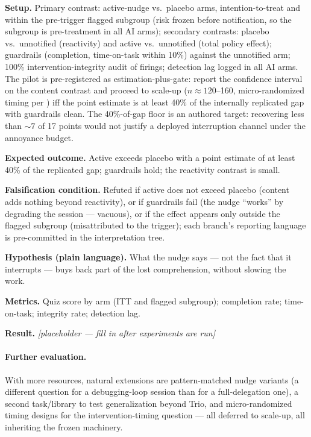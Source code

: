 \documentclass[11pt]{article}
\begin{document}
\textbf{Setup.} Primary contrast: active-nudge vs.\ placebo arms, intention-to-treat and within the pre-trigger flagged subgroup (risk frozen before notification, so the subgroup is pre-treatment in all AI arms); secondary contrasts: placebo vs.\ unnotified (reactivity) and active vs.\ unnotified (total policy effect); guardrails (completion, time-on-task within 10\%) against the unnotified arm; 100\% intervention-integrity audit of firings; detection lag logged in all AI arms. The pilot is pre-registered as estimation-plus-gate: report the confidence interval on the content contrast and proceed to scale-up ($n \approx 120$--160, micro-randomized timing per \citealp{klasnja2015mrt}) iff the point estimate is at least 40\% of the internally replicated gap with guardrails clean. The 40\%-of-gap floor is an authored target: recovering less than ${\sim}7$ of 17 points would not justify a deployed interruption channel under the annoyance budget.

\textbf{Expected outcome.} Active exceeds placebo with a point estimate of at least 40\% of the replicated gap; guardrails hold; the reactivity contrast is small.

\textbf{Falsification condition.} Refuted if active does not exceed placebo (content adds nothing beyond reactivity), or if guardrails fail (the nudge ``works'' by degrading the session --- vacuous), or if the effect appears only outside the flagged subgroup (misattributed to the trigger); each branch's reporting language is pre-committed in the interpretation tree.

\textbf{Hypothesis (plain language).} What the nudge says --- not the fact that it interrupts --- buys back part of the lost comprehension, without slowing the work.

\textbf{Metrics.} Quiz score by arm (ITT and flagged subgroup); completion rate; time-on-task; integrity rate; detection lag.

\textbf{Result.} \emph{[placeholder --- fill in after experiments are run]}

\paragraph{Further evaluation.}
With more resources, natural extensions are pattern-matched nudge variants (a different question for a debugging-loop session than for a full-delegation one), a second task/library to test generalization beyond Trio, and micro-randomized timing designs \citep{klasnja2015mrt} for the intervention-timing question --- all deferred to scale-up, all inheriting the frozen machinery.
\end{document}
